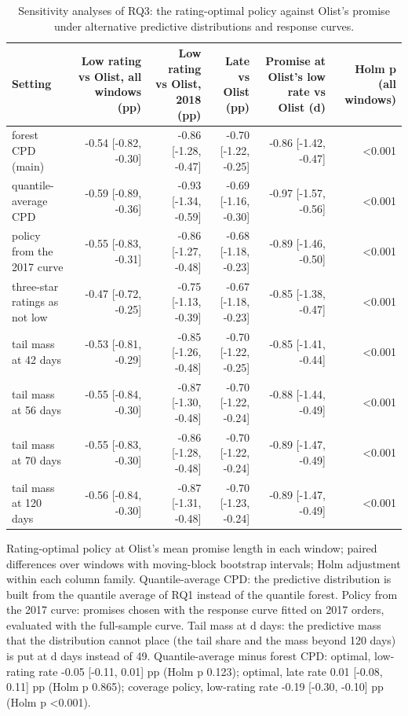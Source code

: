 \begin{table}[!htbp]
\centering
\footnotesize
\caption{Sensitivity analyses of RQ3: the rating-optimal policy against Olist's promise under alternative predictive distributions and response curves.}
\label{tab:sens-rq3}
\begin{tabular}{lrrrrr}
\toprule
Setting & Low rating vs Olist, all windows (pp) & Low rating vs Olist, 2018 (pp) & Late vs Olist (pp) & Promise at Olist's low rate vs Olist (d) & Holm p (all windows) \\
\midrule
forest CPD (main) & -0.54 [-0.82, -0.30] & -0.86 [-1.28, -0.47] & -0.70 [-1.22, -0.25] & -0.86 [-1.42, -0.47] & <0.001 \\
quantile-average CPD & -0.59 [-0.89, -0.36] & -0.93 [-1.34, -0.59] & -0.69 [-1.16, -0.30] & -0.97 [-1.57, -0.56] & <0.001 \\
policy from the 2017 curve & -0.55 [-0.83, -0.31] & -0.86 [-1.27, -0.48] & -0.68 [-1.18, -0.23] & -0.89 [-1.46, -0.50] & <0.001 \\
three-star ratings as not low & -0.47 [-0.72, -0.25] & -0.75 [-1.13, -0.39] & -0.67 [-1.18, -0.23] & -0.85 [-1.38, -0.47] & <0.001 \\
tail mass at 42 days & -0.53 [-0.81, -0.29] & -0.85 [-1.26, -0.48] & -0.70 [-1.22, -0.25] & -0.85 [-1.41, -0.44] & <0.001 \\
tail mass at 56 days & -0.55 [-0.84, -0.30] & -0.87 [-1.30, -0.48] & -0.70 [-1.22, -0.24] & -0.88 [-1.44, -0.49] & <0.001 \\
tail mass at 70 days & -0.55 [-0.83, -0.30] & -0.86 [-1.28, -0.48] & -0.70 [-1.22, -0.24] & -0.89 [-1.47, -0.49] & <0.001 \\
tail mass at 120 days & -0.56 [-0.84, -0.30] & -0.87 [-1.31, -0.48] & -0.70 [-1.23, -0.24] & -0.89 [-1.47, -0.49] & <0.001 \\
\bottomrule
\end{tabular}
\par\smallskip
\parbox{\linewidth}{\scriptsize Rating-optimal policy at Olist's mean promise length in each window; paired differences over windows with moving-block bootstrap intervals; Holm adjustment within each column family. Quantile-average CPD: the predictive distribution is built from the quantile average of RQ1 instead of the quantile forest. Policy from the 2017 curve: promises chosen with the response curve fitted on 2017 orders, evaluated with the full-sample curve. Tail mass at d days: the predictive mass that the distribution cannot place (the tail share and the mass beyond 120 days) is put at d days instead of 49. Quantile-average minus forest CPD: optimal, low-rating rate -0.05 [-0.11, 0.01] pp (Holm p 0.123); optimal, late rate 0.01 [-0.08, 0.11] pp (Holm p 0.865); coverage policy, low-rating rate -0.19 [-0.30, -0.10] pp (Holm p <0.001).}
\end{table}
